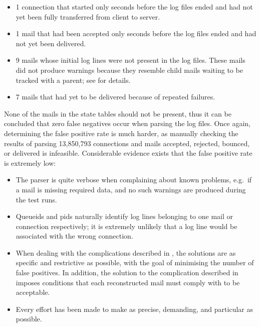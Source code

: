 \begin{itemize}

    \squeezeitems{}

    \item 1 connection that started only seconds before the log files
        ended and had not yet been fully transferred from client to server.

    \item 1 mail that had been accepted only seconds before the log files
        ended and had not yet been delivered.

    \item 9 mails whose initial log lines were not present in the log
        files.  These mails did not produce warnings because they resemble
        child mails waiting to be tracked with a parent; see
         for details.

    \item 7 mails that had yet to be delivered because of repeated
        failures.

\end{itemize}

None of the mails in the state tables should not be present, thus it can be
concluded that zero false negatives occur when parsing the
\numberOFlogFILES{} log files.  Once again, determining the false positive
rate is much harder, as manually checking the results of parsing 13,850,793
connections and mails accepted, rejected, bounced, or delivered is
infeasible.  Considerable evidence exists that the false positive rate is
extremely low:

\begin{itemize}

    \item The parser is quite verbose when complaining about known
        problems, e.g.\ if a mail is missing required data, and no such
        warnings are produced during the test runs.

    \item Queueids and \glspl{pid} naturally identify log lines belonging
        to one mail or connection respectively; it is extremely unlikely
        that a log line would be associated with the wrong connection.

    \item When dealing with the complications described in
        , the solutions are as specific and
        restrictive as possible, with the goal of minimising the number of
        false positives.  In addition, the solution to the complication
        described in  imposes conditions
        that each reconstructed mail must comply with to be acceptable.

    \item Every effort has been made to make \parsername{} as precise,
        demanding, and particular as possible.

\end{itemize}

